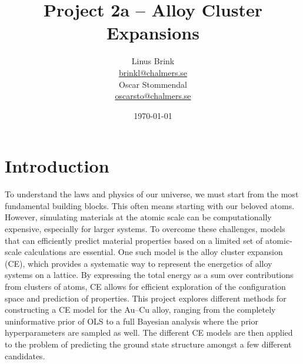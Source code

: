 \documentclass[a4paper, 12pt]{article}
\begin{document}
\lstset{language=Python}
\title{
\sffamily
\vspace{-1.7cm}
{\huge\textbf{Project 2a -- Alloy Cluster Expansions}} \\[-0.1cm]
}
\author{
    \vspace{-0.0cm}
    \begin{minipage}[t]{0.45\textwidth}
\centering
Linus Brink\\
\href{mailto:brinkl@chalmers.se}{brinkl@chalmers.se}
\end{minipage}%
\hfill
\begin{minipage}[t]{0.45\textwidth}
\centering
Oscar Stommendal\\
\href{mailto:oscarsto@chalmers.se}{oscarsto@chalmers.se}
\end{minipage}
}
\date{\today}
\maketitle
\vspace{-1.3cm}
\section{Introduction}
To understand the laws and physics of our universe, we must start from the most fundamental building blocks. This often means starting with our beloved atoms. However, simulating materials at the atomic scale can be computationally expensive, especially for larger systems. To overcome these challenges, models that can efficiently predict material properties based on a limited set of atomic-scale calculations are essential. One such model is the alloy cluster expansion (CE), which provides a systematic way to represent the energetics of alloy systems on a lattice. By expressing the total energy as a sum over contributions from clusters of atoms, CE allows for efficient exploration of the configuration space and prediction of properties. This project explores different methods for constructing a CE model for the Au--Cu alloy, ranging from the completely uninformative prior of OLS to a full Bayesian analysis where the prior hyperparameters are sampled as well. The different CE models are then applied to the problem of predicting the ground state structure amongst a few different candidates.%
\end{document}
